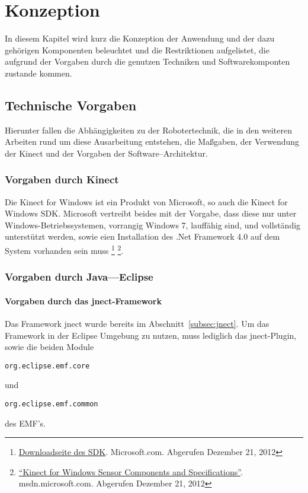 \chapter{Konzeption}
\label{chap:Konzeption}

In diesem Kapitel wird kurz die Konzeption der Anwendung und der dazu geh\"origen Komponenten beleuchtet und die Restriktionen aufgelistet, die aufgrund der Vorgaben durch die genutzen Techniken und Softwarekomponten zustande kommen.

\section{Technische Vorgaben}
Hierunter fallen die Abh\"angigkeiten zu der Robotertechnik, die in den weiteren Arbeiten rund um diese Ausarbeitung entstehen, die Ma\ss gaben, der Verwendung der Kinect und der Vorgaben der Software--Architektur.

\subsection{Vorgaben durch Kinect}
Die Kinect for Windows ist ein Produkt von Microsoft, so auch die Kinect for Windows \acrshort{SDK}. Microsoft vertreibt beides mit der Vorgabe, dass diese nur unter Windows-Betriebssystemen, vorrangig Windows 7, lauff\"ahig sind, und vollst\"andig unterst\"utzt werden, sowie eien Installation des .Net Framework 4.0 auf dem System vorhanden sein muss \footnote{\href{https://www.microsoft.com/en-us/kinectforwindows/develop/}{Downloadseite des SDK}. Microsoft.com. Abgerufen Dezember 21, 2012} \footnote{\href{http://msdn.microsoft.com/en-us/library/jj131033.aspx}{\enquote{Kinect for Windows Sensor Components and Specifications}}. msdn.microsoft.com. Abgerufen Dezember 21, 2012}.

\subsection{Vorgaben durch Java---Eclipse}

\subsubsection{Vorgaben durch das jnect-Framework}
Das Framework jnect wurde bereits im Abschnitt~\ref{subsec:jnect}. Um das \gls{Framework} in der Eclipse Umgebung zu nutzen, muss lediglich das jnect-Plugin, sowie die beiden Module \begin{verbatim}org.eclipse.emf.core\end{verbatim} und \begin{verbatim}org.eclipse.emf.common\end{verbatim} des \gls{EMF}'s.

